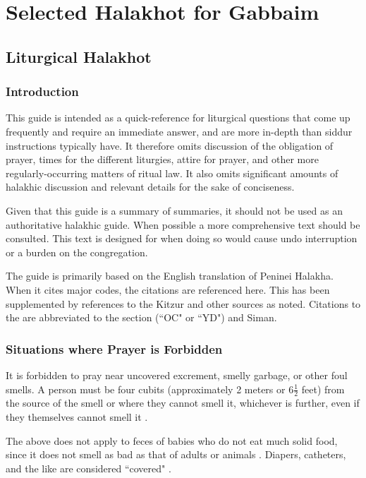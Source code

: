 \part{Selected Halakhot for Gabbaim}

\chapter{Liturgical Halakhot}
\section{Introduction}

This guide is intended as a quick-reference for liturgical questions that come up frequently and require an immediate answer, and are more in-depth than siddur instructions typically have. It therefore omits discussion of the obligation of prayer, times for the different liturgies, attire for prayer, and other more regularly-occurring matters of ritual law. It also omits significant amounts of halakhic discussion and relevant details for the sake of conciseness.

Given that this guide is a summary of summaries, it should not be used as an authoritative halakhic guide. When possible a more comprehensive text should be consulted.  This text is designed for when doing so would cause undo interruption or a burden on the congregation.

The guide is primarily based on the English translation of Peninei Halakha.  When it cites major codes, the citations are referenced here. This has been supplemented by references to the Kitzur \SA\space and other sources as noted. Citations to the \SA\space are abbreviated to the section  (``OC" or ``YD") and Siman.

\section{Situations where Prayer is Forbidden}

It is forbidden to pray near uncovered excrement, smelly garbage, or other foul smells.  A person must be four cubits (approximately 2 meters or 6$\frac{1}{2}$ feet) from the source of the smell or where they cannot smell it, whichever is further, even if they themselves cannot smell it \parencite*[3:9 citing OC 79]{PH}.%

The above does not apply to feces of babies who do not eat much solid food, since it does not smell as bad as that of adults or animals \parencite*[4:3 citing OC 81]{PH}. Diapers, catheters, and the like are considered ``covered" \parencite*[4:4]{PH}.

